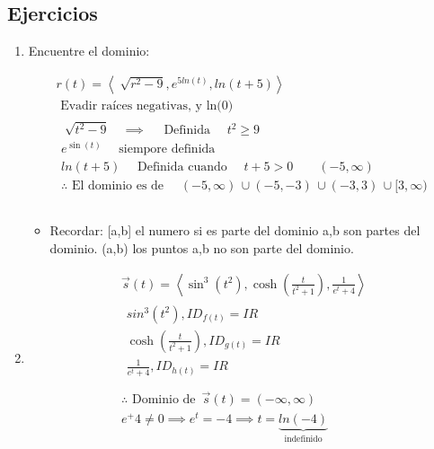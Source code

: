 \subsection{Ejercicios}
\begin{enumerate}
    \item Encuentre el dominio:
        \begin{center}
            \begin{align*}
                r(t) = \left\langle \sqrt[]{r^2-9}, e^{5ln(t)}, ln(t+5) \right\rangle \\ 
                \text{  Evadir raíces negativas, y ln(0)  } \\ 
                \begin{matrix}
                    \sqrt[]{t^2-9} \quad \implies \quad \text{  Definida   } \quad t^2 \geq 9 \\ 
                    e^{\sin(t)} \quad \text{  siempore definida  } \\ 
                    ln(t+5) \quad \text{  Definida cuando   } \quad t +5 > 0 \quad \quad (-5, \infty ) \\ 
                    \therefore \text{  El dominio es de   } \quad (-5,\infty ) \, \cup (-5,-3) \, \cup (-3,3) \, \cup [3,\infty ) \\ 
                \end{matrix} \\ 
            \end{align*}
        \end{center}
        \begin{itemize}[label=\#]
            \item Recordar: [a,b] el numero si es parte del dominio a,b son partes del dominio. (a,b) los puntos a,b no son parte del dominio.
        \end{itemize}
    \item \begin{center}
        \begin{align*}
            \vec{s}(t) = \left\langle \sin^3(t^2), \cosh(\frac{t}{t^2+1} ), \frac{1}{e^t+4}  \right\rangle \\ 
            \begin{matrix}
                sin^3(t^2), ID_{f(t)} = IR \\ 
                \cosh(\frac{t}{t^2+1} ), ID_{g(t)} = IR \\ 
                \frac{1}{e^t+4}, ID_{h(t)} = IR \\ 
            \end{matrix} \\ 
            \therefore \text{  Dominio de   } \, \vec{s}(t) = (-\infty ,\infty ) \\ 
            e^+4\neq 0 \implies e^t=-4 \implies t = \underbrace{ln(-4)}_{\text{  indefinido  }} \\ 
        \end{align*}
    \end{center}
\end{enumerate}


